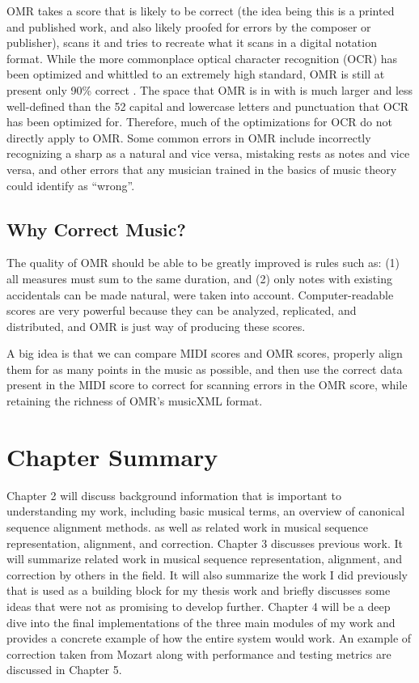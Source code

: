 OMR takes a score that is likely to be correct (the idea being this is a printed and published work, and also likely proofed for errors by the composer or publisher), scans it and tries to recreate what it scans in a digital notation format. While the more commonplace optical character recognition (OCR) has been optimized and whittled to an extremely high standard, OMR is still at present only 90\% correct \cite{rebelo}. The space that OMR is in with is much larger and less well-defined than the 52 capital and lowercase letters and punctuation that OCR has been optimized for. Therefore, much of the optimizations for OCR do not directly apply to OMR. Some common errors in OMR include incorrectly recognizing a sharp as a natural and vice versa, mistaking rests as notes and vice versa, and other errors that any musician trained in the basics of music theory could identify as ``wrong''. 

\subsection{Why Correct Music?}
The quality of OMR should be able to be greatly improved is rules such as: (1) all measures must sum to the same duration, and (2) only notes with existing accidentals can be made natural, were taken into account. Computer-readable scores are very powerful because they can be analyzed, replicated, and distributed, and OMR is just way of producing these scores. 

A big idea is that we can compare MIDI scores and OMR scores, properly align them for as many points in the music as possible, and then use the correct data present in the MIDI score to correct for scanning errors in the OMR score, while retaining the richness of OMR's musicXML format.

\section{Chapter Summary}
Chapter 2 will discuss background information that is important to understanding my work, including basic musical terms, an overview of canonical sequence alignment methods. as well as related work in musical sequence representation, alignment, and correction. Chapter 3 discusses previous work. It will summarize related work in musical sequence representation, alignment, and correction by others in the field. It will also summarize the work I did previously that is used as a building block for my thesis work and briefly discusses some ideas that were not as promising to develop further. Chapter 4 will be a deep dive into the final implementations of the three main modules of my work and provides a concrete example of how the entire system would work. An example of correction taken from Mozart along with performance and testing metrics are discussed in Chapter 5.
